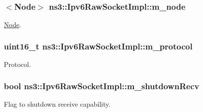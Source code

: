 \subsubsection[{\texorpdfstring{m\+\_\+node}{m_node}}]{$<${\bf Node}$>$ ns3\+::\+Ipv6\+Raw\+Socket\+Impl\+::m\+\_\+node\hspace{0.3cm}{\ttfamily [private]}}\hypertarget{classns3_1_1Ipv6RawSocketImpl_a2afa14d1f4c1f729c989c00e3ad350fb}{}\label{classns3_1_1Ipv6RawSocketImpl_a2afa14d1f4c1f729c989c00e3ad350fb}


\hyperlink{classns3_1_1Node}{Node}. 

\subsubsection[{\texorpdfstring{m\+\_\+protocol}{m_protocol}}]{\setlength{\rightskip}{0pt plus 5cm}uint16\+\_\+t ns3\+::\+Ipv6\+Raw\+Socket\+Impl\+::m\+\_\+protocol\hspace{0.3cm}{\ttfamily [private]}}\hypertarget{classns3_1_1Ipv6RawSocketImpl_ac745a953c5ec673bd89b170eaadab548}{}\label{classns3_1_1Ipv6RawSocketImpl_ac745a953c5ec673bd89b170eaadab548}


Protocol. 

\subsubsection[{\texorpdfstring{m\+\_\+shutdown\+Recv}{m_shutdownRecv}}]{\setlength{\rightskip}{0pt plus 5cm}bool ns3\+::\+Ipv6\+Raw\+Socket\+Impl\+::m\+\_\+shutdown\+Recv\hspace{0.3cm}{\ttfamily [private]}}\hypertarget{classns3_1_1Ipv6RawSocketImpl_a6db5d278326c66329425f615ccdf63ec}{}\label{classns3_1_1Ipv6RawSocketImpl_a6db5d278326c66329425f615ccdf63ec}


Flag to shutdown receive capability. 

